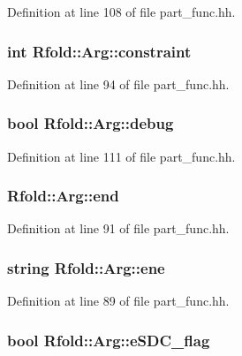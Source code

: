 Definition at line 108 of file part\+\_\+func.\+hh.

\hypertarget{class_rfold_1_1_arg_ab05512b7f96ce930ac13b873e7c298b1}{
\subsubsection[{constraint}]{\setlength{\rightskip}{0pt plus 5cm}int Rfold\+::\+Arg\+::constraint}}\label{class_rfold_1_1_arg_ab05512b7f96ce930ac13b873e7c298b1}


Definition at line 94 of file part\+\_\+func.\+hh.

\hypertarget{class_rfold_1_1_arg_ad6f2d65fd94879a530699ee4680e5d63}{
\subsubsection[{debug}]{\setlength{\rightskip}{0pt plus 5cm}bool Rfold\+::\+Arg\+::debug}}\label{class_rfold_1_1_arg_ad6f2d65fd94879a530699ee4680e5d63}


Definition at line 111 of file part\+\_\+func.\+hh.

\hypertarget{class_rfold_1_1_arg_ad5641c6dff38e98a3dadb60223a4b630}{
\subsubsection[{end}]{ Rfold\+::\+Arg\+::end}}\label{class_rfold_1_1_arg_ad5641c6dff38e98a3dadb60223a4b630}


Definition at line 91 of file part\+\_\+func.\+hh.

\hypertarget{class_rfold_1_1_arg_a3fc1f86f5f3f7b2572392b547a2ef6a9}{
\subsubsection[{ene}]{\setlength{\rightskip}{0pt plus 5cm}string Rfold\+::\+Arg\+::ene}}\label{class_rfold_1_1_arg_a3fc1f86f5f3f7b2572392b547a2ef6a9}


Definition at line 89 of file part\+\_\+func.\+hh.

\hypertarget{class_rfold_1_1_arg_addf5237deb4bf9025fa747fbd2c33366}{
\subsubsection[{e\+S\+D\+C\+\_\+flag}]{\setlength{\rightskip}{0pt plus 5cm}bool Rfold\+::\+Arg\+::e\+S\+D\+C\+\_\+flag}}\label{class_rfold_1_1_arg_addf5237deb4bf9025fa747fbd2c33366}


